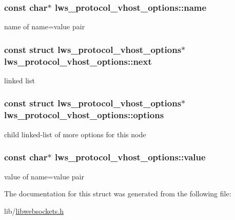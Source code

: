 \subsubsection[{\texorpdfstring{name}{name}}]{\setlength{\rightskip}{0pt plus 5cm}const char$\ast$ lws\+\_\+protocol\+\_\+vhost\+\_\+options\+::name}\hypertarget{structlws__protocol__vhost__options_acf9db77f8eb64cd4e314be9b43d8a8b9}{}\label{structlws__protocol__vhost__options_acf9db77f8eb64cd4e314be9b43d8a8b9}
name of name=value pair 
\subsubsection[{\texorpdfstring{next}{next}}]{\setlength{\rightskip}{0pt plus 5cm}const struct {\bf lws\+\_\+protocol\+\_\+vhost\+\_\+options}$\ast$ lws\+\_\+protocol\+\_\+vhost\+\_\+options\+::next}\hypertarget{structlws__protocol__vhost__options_abc714ddb4171756fc8196e9823a1e21c}{}\label{structlws__protocol__vhost__options_abc714ddb4171756fc8196e9823a1e21c}
linked list 
\subsubsection[{\texorpdfstring{options}{options}}]{\setlength{\rightskip}{0pt plus 5cm}const struct {\bf lws\+\_\+protocol\+\_\+vhost\+\_\+options}$\ast$ lws\+\_\+protocol\+\_\+vhost\+\_\+options\+::options}\hypertarget{structlws__protocol__vhost__options_afd99fbc90be51ea2465b550c2ec47822}{}\label{structlws__protocol__vhost__options_afd99fbc90be51ea2465b550c2ec47822}
child linked-\/list of more options for this node 
\subsubsection[{\texorpdfstring{value}{value}}]{\setlength{\rightskip}{0pt plus 5cm}const char$\ast$ lws\+\_\+protocol\+\_\+vhost\+\_\+options\+::value}\hypertarget{structlws__protocol__vhost__options_a0640a92513c70ee6b9b295a9ad1658e7}{}\label{structlws__protocol__vhost__options_a0640a92513c70ee6b9b295a9ad1658e7}
value of name=value pair 

The documentation for this struct was generated from the following file\+:\begin{DoxyCompactItemize}
\item 
lib/\hyperlink{libwebsockets_8h}{libwebsockets.\+h}\end{DoxyCompactItemize}
